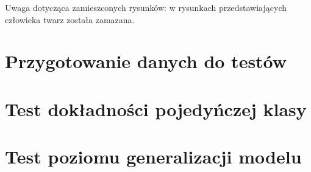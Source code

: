 Uwaga dotycząca zamieszconych rysunków: w rysunkach przedstawiających człowieka twarz została zamazana.


\section{Przygotowanie danych do testów}
\label{sec:test-wspoldzielony}


\section{Test dokładności pojedyńczej klasy}
\label{sec:test-1}


\section{Test poziomu generalizacji modelu}
\label{sec:test-2}


